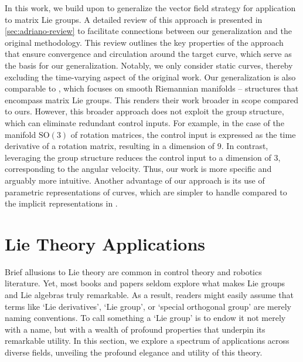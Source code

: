 In this work, we build upon \citet{Rezende2022} to generalize the vector field strategy for application to matrix Lie groups. A detailed review of this approach is presented in \cref{sec:adriano-review} to facilitate connections between our generalization and the original methodology. This review outlines the key properties of the approach that ensure convergence and circulation around the target curve, which serve as the basis for our generalization. Notably, we only consider static curves, thereby excluding the time-varying aspect of the original work. Our generalization is also comparable to \citet{yao2022topological}, which focuses on smooth Riemannian manifolds -- structures that encompass matrix Lie groups. This renders their work broader in scope compared to ours. However, this broader approach does not exploit the group structure, which can eliminate redundant control inputs. For example, in the case of the manifold $\text{SO}(3)$ of rotation matrices, the control input is expressed as the time derivative of a rotation matrix, resulting in a dimension of $9$. In contrast, leveraging the group structure reduces the control input to a dimension of $3$, corresponding to the angular velocity. Thus, our work is more specific and arguably more intuitive. Another advantage of our approach is its use of parametric representations of curves, which are simpler to handle compared to the implicit representations in \citet{yao2022topological}.

\section{Lie Theory Applications} \label{sec:lit-review-lie-theory}
Brief allusions to Lie theory are common in control theory and robotics literature. Yet, most books and papers seldom explore what makes Lie groups and Lie algebras truly remarkable. As a result, readers might easily assume that terms like `Lie derivatives', `Lie group', or `special orthogonal group' are merely naming conventions. To call something a `Lie group' is to endow it not merely with a name, but with a wealth of profound properties that underpin its remarkable utility. In this section, we explore a spectrum of applications across diverse fields, unveiling the profound elegance and utility of this theory.

